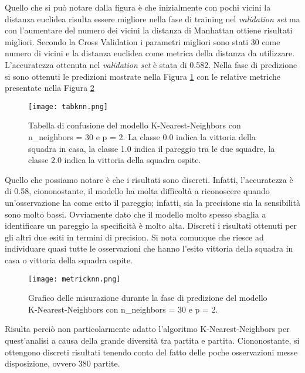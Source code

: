 Quello che si può notare dalla figura è che inizialmente con pochi vicini la distanza euclidea risulta essere migliore nella fase di training nel \emph{validation} \emph{set} ma con l'aumentare del numero dei vicini la distanza di Manhattan ottiene risultati migliori. Secondo la Cross Validation i parametri migliori sono stati 30 come numero di vicini e la distanza euclidea come metrica della distanza da utilizzare. L'accuratezza ottenuta nel \emph{validation} \emph{set} è stata di 0.582.
Nella fase di predizione si sono ottenuti le predizioni mostrate nella Figura \ref{fig:knnpre} con le relative metriche presentate nella Figura \ref{fig:knnmetrics}

\begin{figure}[h]
	\begin{center}
		\texttt{[image: tabknn.png]}
		\caption{Tabella di confusione del modello K-Nearest-Neighbors con n\_neighbors = 30 e p = 2. La classe 0.0 indica la vittoria della squadra in casa, la classe 1.0 indica il pareggio tra le due squadre, la classe 2.0 indica la vittoria della squadra ospite.
		} 
		\label{fig:knnpre}
	\end{center}
\end{figure}

Quello che possiamo notare è che i risultati sono discreti. Infatti, l'accuratezza è di 0.58, ciononostante, il modello ha molta difficoltà a riconoscere quando un’osservazione ha come esito il pareggio; infatti, sia la precisione sia la sensibilità sono molto bassi. Ovviamente dato che il modello molto spesso sbaglia a identificare un pareggio la specificità è molto alta. Discreti i risultati ottenuti per gli altri due esiti in termini di precision. Si nota comunque che riesce ad individuare quasi tutte le osservazioni che hanno l'esito vittoria della squadra in casa o vittoria della squadra ospite.
\begin{figure}[h]
	\begin{center}
		\texttt{[image: metricknn.png]}
		\caption{Grafico delle misurazione durante la fase di predizione del modello K-Nearest-Neighbors con n\_neighbors = 30 e p = 2.
		} 
		\label{fig:knnmetrics}
	\end{center}
\end{figure}

Risulta perciò non particolarmente adatto l'algoritmo K-Nearest-Neighbors per quest'analisi a causa della grande diversità tra partita e partita. Ciononostante, si ottengono discreti risultati tenendo conto del fatto delle poche osservazioni messe disposizione, ovvero 380 partite.
